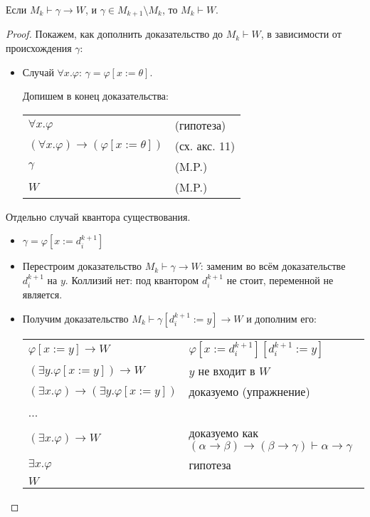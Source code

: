 \begin{lemma}
    Если $M_k\vdash\gamma\to W$, и $\gamma\in M_{k+1}\setminus M_k$, то $M_k\vdash W$.
\end{lemma}

\begin{proof}
Покажем, как дополнить доказательство до $M_k\vdash W$, в зависимости от происхождения $\gamma$:


\begin{itemize}
\item Случай $\forall x.\varphi$: $\gamma = \varphi[x:=\theta]$.

Допишем в конец доказательства:

\begin{tabular}{ll}
$\forall x.\varphi$ & (гипотеза)\\
$(\forall x.\varphi)\to(\varphi[x:=\theta])$ & (сх. акс. 11)\\
$\gamma$  & (M.P.) \\
$W$ & (M.P.)
\end{tabular}
\end{itemize}

Отдельно случай квантора существования.

\begin{itemize}\item $\gamma = \varphi[x := d^{k+1}_i]$


    \item Перестроим доказательство $M_k\vdash \gamma\to W$:
    заменим во всём доказательстве $d^{k+1}_i$ на $y$.
    Коллизий нет: под квантором $d^{k+1}_i$ не стоит, переменной не является.
    \item Получим доказательство $M_k\vdash \gamma[d^{k+1}_i := y]\to W$ и дополним его:

    \begin{tabular}{ll}
    $\varphi[x := y]\to W$ & $\varphi[x := d^{k+1}_i][d^{k+1}_i := y]$\\
    $(\exists y.\varphi[x:=y])\to W$ & $y$ не входит в $W$ \\
    $(\exists x.\varphi)\to(\exists y.\varphi[x:=y])$ & доказуемо (упражнение)\\
     ... \\
    $(\exists x.\varphi)\to W$ & доказуемо как $(\alpha\to\beta)\to(\beta\to\gamma)\vdash\alpha\to\gamma$ \\
    $\exists x.\varphi$ & гипотеза\\
    $W$
    \end{tabular}
\end{itemize}
\end{proof}

